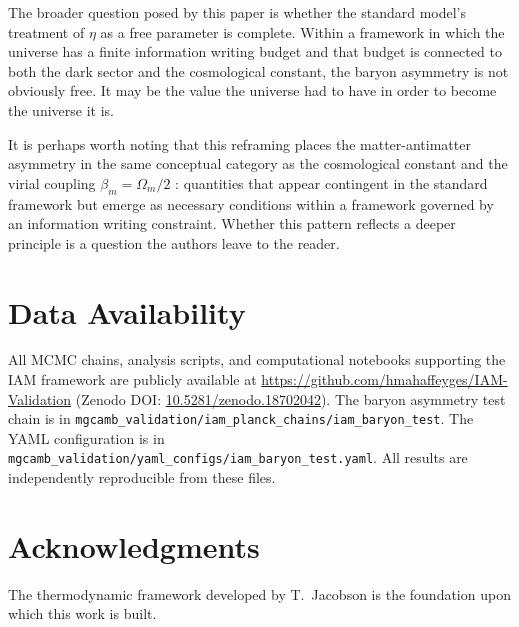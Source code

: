 \documentclass[12pt,a4paper]{article}
\begin{document}
The broader question posed by this paper is whether the standard
model's treatment of $\eta$ as a free parameter is complete. Within a
framework in which the universe has a finite information writing budget
and that budget is connected to both the dark sector and the
cosmological constant, the baryon asymmetry is not obviously free. It
may be the value the universe had to have in order to become the
universe it is.

It is perhaps worth noting that this reframing places the
matter-antimatter asymmetry in the same conceptual category as the
cosmological constant \citep{mahaffey2026_cc} and the virial coupling
$\beta_m = \Omega_m/2$ \citep{mahaffey2026}: quantities that appear
contingent in the standard framework but emerge as necessary conditions
within a framework governed by an information writing constraint. Whether
this pattern reflects a deeper principle is a question the authors leave
to the reader.

\section*{Data Availability}

All MCMC chains, analysis scripts, and computational notebooks supporting
the IAM framework are publicly available at
\url{https://github.com/hmahaffeyges/IAM-Validation}
(Zenodo DOI:
\href{https://doi.org/10.5281/zenodo.18702042}{10.5281/zenodo.18702042}).
The baryon asymmetry test chain is in
\texttt{mgcamb\_validation/iam\_planck\_chains/iam\_baryon\_test}.
The YAML configuration is in
\texttt{mgcamb\_validation/yaml\_configs/iam\_baryon\_test.yaml}.
All results are independently reproducible from these files.

\section*{Acknowledgments}

The thermodynamic framework developed by T.\ Jacobson
\citep{jacobson1995} is the foundation upon which this work is built.
\end{document}
